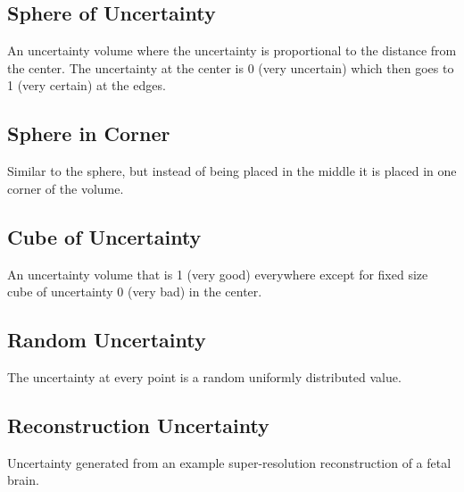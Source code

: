 \subsection*{Sphere of Uncertainty}
An uncertainty volume where the uncertainty is proportional to the distance from the center. The uncertainty at the center is 0 (very uncertain) which then goes to 1 (very certain) at the edges.

\subsection*{Sphere in Corner}
Similar to the sphere, but instead of being placed in the middle it is placed in one corner of the volume.

\subsection*{Cube of Uncertainty}
An uncertainty volume that is 1 (very good) everywhere except for fixed size cube of uncertainty 0 (very bad) in the center.

\subsection*{Random Uncertainty}
The uncertainty at every point is a random uniformly distributed value.

\subsection*{Reconstruction Uncertainty}
Uncertainty generated from an example super-resolution reconstruction of a fetal brain.\\

